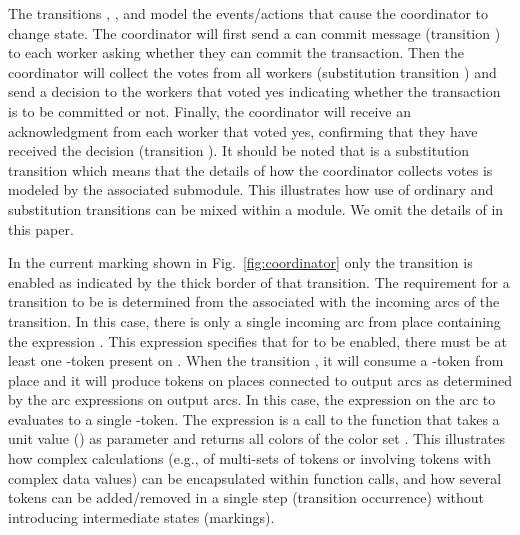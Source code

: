 The transitions , , and
 model the events/actions that cause
the coordinator to change state. The coordinator will first send a can
commit message (transition ) to each worker
asking whether they can commit the transaction. Then the coordinator
will collect the votes from all workers (substitution transition
) and send a decision to the workers that voted
yes indicating whether the transaction is to be committed or
not. Finally, the coordinator will receive an acknowledgment from each
worker that voted yes, confirming that they have received the decision
(transition ).  It should be noted
that  is a substitution transition which means
that the details of how the coordinator collects votes is modeled by
the associated  submodule. This illustrates how
use of ordinary and substitution transitions can be mixed within a
module. We omit the details of  in this paper.


In the current marking shown in Fig.~\ref{fig:coordinator} only the
transition  is enabled as indicated by the
thick border of that transition. The requirement for a transition to
be  is determined from the 
associated with the incoming arcs of the transition. In this case,
there is only a single incoming arc from place 
containing the expression \smlcode{()}. This expression specifies that
for  to be enabled, there must be at least one
\smlcode{()}-token present on . When the
 transition , it will consume a
\smlcode{()}-token from place  and it will produce
tokens on places connected to output arcs as determined by
 the arc expressions on output arcs. In this case,
the expression \smlcode{()} on the arc to 
evaluates to a single \smlcode{()}-token. The expression
 is a call to the function 
that takes a unit value (\smlcode{()}) as parameter and returns all
colors of the color set . This illustrates how complex
calculations (e.g., of multi-sets of tokens or involving tokens with
complex data values) can be encapsulated within function calls, and
how several tokens can be added/removed in a single step (transition
occurrence) without introducing intermediate states (markings).

